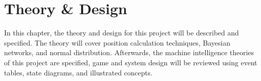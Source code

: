 \chapter{Theory \& Design}\label{chapter:theory-and-design}
In this chapter, the theory and design for this project will be described and specified.
The theory will cover position calculation techniques, Bayesian networks, and normal distribution.
Afterwards, the machine intelligence theories of this project are specified, game and system design will be reviewed using event tables, state diagrams, and illustrated concepts.

%




%





